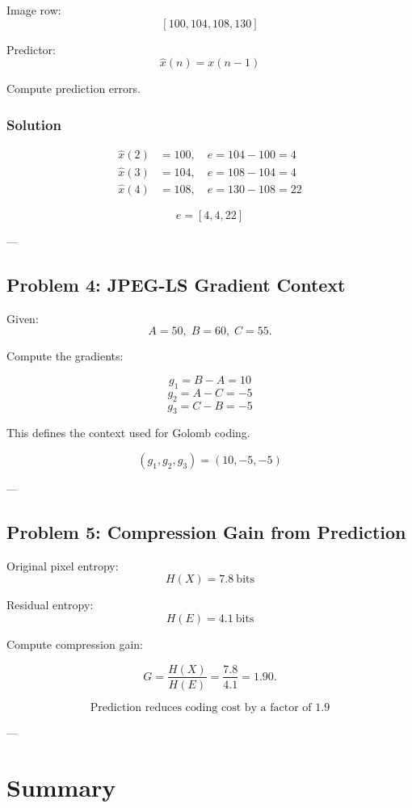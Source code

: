 \documentclass{AnantDocumentation}
\begin{document}
Image row:
\[
[100, 104, 108, 130]
\]

Predictor:
\[
\hat{x}(n)=x(n-1)
\]

Compute prediction errors.

\subsubsection*{Solution}

\[
\begin{aligned}
\hat{x}(2) &= 100,\quad e=104-100=4 \\
\hat{x}(3) &= 104,\quad e=108-104=4 \\
\hat{x}(4) &= 108,\quad e=130-108=22
\end{aligned}
\]

\[
\boxed{e = [4,4,22]}
\]

---

\subsection*{Problem 4: JPEG-LS Gradient Context}

Given:
\[
A=50,\; B=60,\; C=55.
\]

Compute the gradients:

\[
g_1 = B-A = 10
\]
\[
g_2 = A-C = -5
\]
\[
g_3 = C-B = -5
\]

This defines the context used for Golomb coding.

\[
\boxed{(g_1,g_2,g_3) = (10,-5,-5)}
\]

---

\subsection*{Problem 5: Compression Gain from Prediction}

Original pixel entropy:
\[
H(X)=7.8\ \text{bits}
\]

Residual entropy:
\[
H(E)=4.1\ \text{bits}
\]

Compute compression gain:

\[
G = \frac{H(X)}{H(E)} = \frac{7.8}{4.1} = 1.90.
\]

\[
\boxed{\text{Prediction reduces coding cost by a factor of } 1.9}
\]

---

\section*{Summary}
\end{document}
